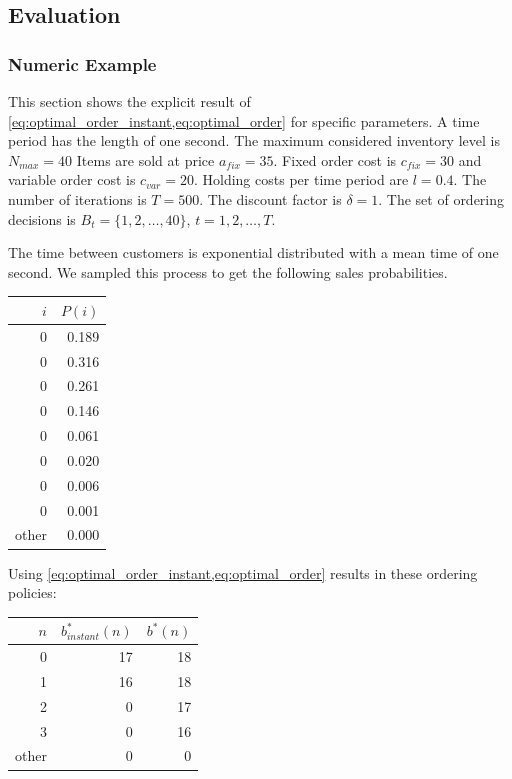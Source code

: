 \subsection{Evaluation}

\subsubsection{Numeric Example}
\label{section:order_example}
This section shows the explicit result of \cref{eq:optimal_order_instant,eq:optimal_order} for specific parameters. A time period has the length of one second.
The maximum considered inventory level is $N_{max} = 40$
Items are sold at price $a_{fix} = 35$.
Fixed order cost is $c_{fix} = 30$ and variable order cost is $c_{var} = 20$.
Holding costs per time period are $l = 0.4$.
The number of iterations is $T = 500$.
The discount factor is $\delta = 1$.
The set of ordering decisions is $B_t = \{1, 2, \ldots, 40\}$, $t = 1, 2, \ldots, T$.

The time between customers is exponential distributed with a mean time of one second.
We sampled this process to get the following sales probabilities.

\begin{table}
\centering
\begin{tabular}{rr}
	\toprule
	$i$ & $P(i)$ \\
	\midrule
	0 & 0.189 \\
	0 & 0.316 \\
	0 & 0.261 \\
	0 & 0.146 \\
	0 & 0.061 \\
	0 & 0.020 \\
	0 & 0.006 \\
	0 & 0.001 \\
	other & 0.000 \\
	\bottomrule
\end{tabular}
\end{table}

Using \cref{eq:optimal_order_instant,eq:optimal_order} results in these ordering policies:

\begin{table}
	\centering
	\begin{tabular}{rrr}
		\toprule
		$n$ & $b^*_{instant}(n)$ & $b^*(n)$ \\
		\midrule
		0 & 17 & 18 \\
		1 & 16 & 18 \\
		2 & 0 & 17 \\
		3 & 0 & 16\\
		other & 0 & 0 \\
		\bottomrule
	\end{tabular}
\end{table}

